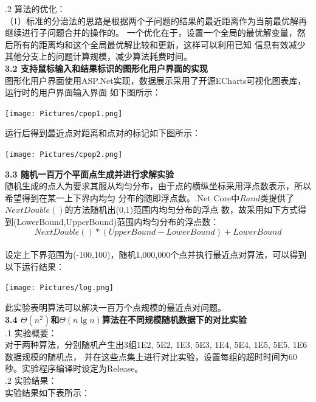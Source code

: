 \documentclass[a4paper]{article}
\begin{document}
\begin{enumerate}
  .2 算法的优化：\\
  （1）标准的分治法的思路是根据两个子问题的结果的最近距离作为当前最优解再继续进行子问题合并的操作的。
  一个优化在于，设置一个全局的最优解变量，然后所有的距离均和这个全局最优解比较和更新，这样可以利用已知
  信息有效减少其他分支上的问题计算规模，减少算法耗费时间。\\
  \medskip
  \textbf{3.2 支持鼠标输入和结果标识的图形化用户界面的实现}\\
  \medskip
  图形化用户界面使用ASP.Net实现，数据展示采用了开源ECharts可视化图表库，运行时的用户界面输入界面
  如下图所示：
  \bigskip
  \begin{center}
    \texttt{[image: Pictures/cpop1.png]}
  \end{center}
  运行后得到最近点对距离和点对的标记如下图所示：
  \bigskip
  \begin{center}
    \texttt{[image: Pictures/cpop2.png]}
  \end{center}
  \medskip
  \textbf{3.3 随机一百万个平面点生成并进行求解实验}\\
  \medskip
  随机生成的点人为要求其服从均匀分布，由于点的横纵坐标采用浮点数表示，所以希望得到在某一上下界内均匀
  分布的随即浮点数。.Net Core中$Rand$类提供了$NextDouble()$的方法随机出(0,1)范围内均匀分布的浮点
  数，故采用如下方式得到(LowerBound,UpperBound)范围内均匀分布的浮点数：
  $$NextDouble()*(UpperBound-LowerBound)+LowerBound$$\\
  设定上下界范围为(-100,100)，随机1,000,000个点并执行最近点对算法，可以得到以下运行结果：
  \bigskip
  \begin{center}
    \texttt{[image: Pictures/log.png]}
  \end{center}
  此实验表明算法可以解决一百万个点规模的最近点对问题。\\
  \medskip
  \textbf{3.4 $\Theta(n^2)$和$\Theta(n\lg n)$算法在不同规模随机数据下的对比实验}\\
  .1 实验概要：\\
  对于两种算法，分别随机产生出3组1E2, 5E2, 1E3, 5E3, 1E4, 5E4, 1E5, 5E5, 1E6数据规模的随机点，
  并在这些点集上进行对比实验，设置每组的超时时间为60秒。实验程序编译时设定为Release。\\
  .2 实验结果：\\
  实验结果如下表所示：\\ \medskip
\end{enumerate}
\end{document}
